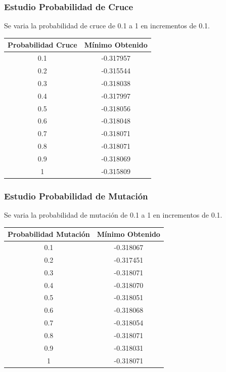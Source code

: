 \documentclass[12pt]{article}
\begin{document}
\subsubsection*{Estudio Probabilidad de Cruce}
	Se varia la probabilidad de cruce de 0.1 a 1 en incrementos de 0.1.
\begin{table}[H]
\begin{center}
\begin{tabular}{|cc|} \hline
Probabilidad Cruce & Mínimo Obtenido \\  \hline
0.1 & -0.317957 \\ 
0.2 & -0.315544 \\ 
0.3 & -0.318038 \\
0.4 & -0.317997 \\
0.5 & -0.318056 \\
0.6 & -0.318048 \\
0.7 & -0.318071 \\
0.8 & -0.318071 \\ 
0.9 & -0.318069 \\
1   & -0.315809 \\  \hline
\end{tabular}
\end{center}
\end{table}
\subsubsection*{Estudio Probabilidad de Mutación}
	Se varia la probabilidad de mutación de 0.1 a 1 en incrementos de 0.1.
\begin{table}[H]
\begin{center}
\begin{tabular}{|cc|} \hline
Probabilidad Mutación & Mínimo Obtenido \\  \hline
0.1 & -0.318067 \\ 
0.2 & -0.317451 \\ 
0.3 & -0.318071 \\
0.4 & -0.318070 \\
0.5 & -0.318051 \\
0.6 & -0.318068 \\
0.7 & -0.318054 \\
0.8 & -0.318071 \\ 
0.9 & -0.318031 \\
1   & -0.318071 \\  \hline
\end{tabular}
\end{center}
\end{table}
\end{document}
